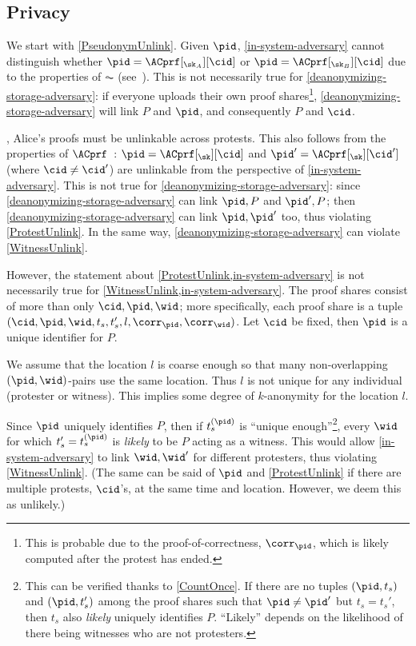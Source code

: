 \subsection{Privacy}

We start with \cref{PseudonymUnlink}.
Given \(\pid\), \cref{in-system-adversary} cannot distinguish whether \(\pid = 
  \ACprf[_{\sk_A}][\cid]\) or \(\pid = \ACprf[_{\sk_B}][\cid]\) due to the 
properties of \(\AC\) (see~\cite{HowToWinTheCloneWars}).
This is not necessarily true for \cref{deanonymizing-storage-adversary}:
if everyone uploads their own proof shares\footnote{%
  This is probable due to the proof-of-correctness, \(\corr_\pid\), which is 
  likely computed after the protest has ended.
}, \cref{deanonymizing-storage-adversary} will link \(P\) and \(\pid\), and 
consequently \(P\) and \(\cid\).

, Alice's proofs must be unlinkable across protests.
This also follows from the properties of 
\(\ACprf\)~\cite{HowToWinTheCloneWars}: \(\pid =  \ACprf[_{\sk}][\cid]\) and 
\(\pid' = \ACprf[_{\sk}][\cid']\) (where \(\cid \neq \cid'\)) are unlinkable 
from the perspective of \cref{in-system-adversary}.
This is not true for \cref{deanonymizing-storage-adversary}: since 
\cref{deanonymizing-storage-adversary} can link \(\pid, P\) and \(\pid', P\); 
then \cref{deanonymizing-storage-adversary} can link \(\pid, \pid'\) too, thus 
violating \cref{ProtestUnlink}.
In the same way, \cref{deanonymizing-storage-adversary} can violate 
\cref{WitnessUnlink}.

However, the statement about \cref{ProtestUnlink,in-system-adversary} is not 
necessarily true for \cref{WitnessUnlink,in-system-adversary}.
The proof shares consist of more than only \(\cid, \pid, \wid\); more 
specifically, each proof share is a tuple \((\cid, \pid, \wid, t_s, t_s', l, 
  \corr_\pid, \corr_\wid)\).
Let \(\cid\) be fixed, then \(\pid\) is a unique identifier for \(P\).

We assume that the location \(l\) is coarse enough so that many non-overlapping 
\((\pid, \wid)\)-pairs use the same location.
Thus \(l\) is not unique for any individual (protester or witness).
This implies some degree of \(k\)-anonymity for the location \(l\).

Since \(\pid\) uniquely identifies \(P\), then if \(t_s^{(\pid)}\) is 
\enquote{unique enough}\footnote{%
  This can be verified thanks to \cref{CountOnce}.
  If there are no tuples \((\pid, t_s)\) and \((\pid, t_s')\) among the proof 
  shares such that \(\pid \neq \pid'\) but \(t_s = t_s'\), then \(t_s\) also 
  \emph{likely} uniquely identifies \(P\).
  \enquote{Likely} depends on the likelihood of there being witnesses who are 
  not protesters.
}, every \(\wid\) for which \(t_s' = t_s^{(\pid)}\) is \emph{likely} to be 
\(P\) acting as a witness.
This would allow \cref{in-system-adversary} to link \(\wid, \wid'\) for 
different protesters, thus violating \cref{WitnessUnlink}.
(The same can be said of \(\pid\) and \cref{ProtestUnlink} if there are 
multiple protests, \ie \(\cid\)'s, at the same time and location.
However, we deem this as unlikely.)

